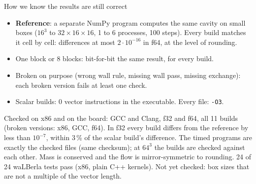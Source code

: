 \documentclass[aspectratio=169,10pt,t]{beamer}
\newcommand{\term}[1]{\textcolor{psblue!85!black}{\textbf{#1}}} %
\newcommand{\code}[1]{\texttt{#1}}
\begin{document}
\begin{frame}{How we know the results are still correct}
  \vspace{1mm}
  \begin{itemize}\small
    \item \term{Reference}: a separate NumPy program computes the same cavity on small boxes ($16^3$ to
          $32\times16\times16$, 1 to 6 processes, 100 steps). Every build matches it cell by cell:
          differences at most $2\cdot 10^{-16}$ in f64, at the level of rounding.
    \item One block or 8 blocks: bit-for-bit the same result, for every build.
    \item Broken on purpose (wrong wall rule, missing wall pass, missing exchange): each broken version
          fails at least one check.
    \item Scalar builds: 0 vector instructions in the executable. Every file: \code{-O3}.
  \end{itemize}
  \vspace{1mm}
  {\scriptsize\color{psgray}Checked on x86 and on the board: GCC and Clang, f32 and f64, all 11 builds
  (broken versions: x86, GCC, f64). In f32 every build differs from the reference by less than $10^{-7}$,
  within 3\,\% of the scalar build's difference. The timed programs are exactly the checked files (same
  checksum); at $64^3$ the builds are checked against each other. Mass is conserved and the flow is
  mirror-symmetric to rounding. 24 of 24 waLBerla tests pass (x86, plain C++ kernels). Not yet checked:
  box sizes that are not a multiple of the vector length.\par}
\end{frame}
\end{document}
